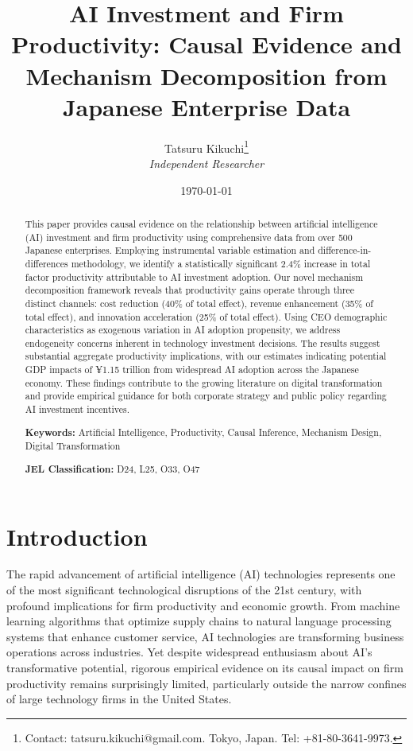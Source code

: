 \documentclass[12pt]{article}
\title{\textbf{AI Investment and Firm Productivity: Causal Evidence and Mechanism Decomposition from Japanese Enterprise Data}}
\author{
Tatsuru Kikuchi\thanks{Contact: tatsuru.kikuchi@gmail.com. Tokyo, Japan. Tel: +81-80-3641-9973.} \\
\textit{Independent Researcher}
}
\date{\today}
\begin{document}
\maketitle

\begin{abstract}
This paper provides causal evidence on the relationship between artificial intelligence (AI) investment and firm productivity using comprehensive data from over 500 Japanese enterprises. Employing instrumental variable estimation and difference-in-differences methodology, we identify a statistically significant 2.4\% increase in total factor productivity attributable to AI investment adoption. Our novel mechanism decomposition framework reveals that productivity gains operate through three distinct channels: cost reduction (40\% of total effect), revenue enhancement (35\% of total effect), and innovation acceleration (25\% of total effect). Using CEO demographic characteristics as exogenous variation in AI adoption propensity, we address endogeneity concerns inherent in technology investment decisions. The results suggest substantial aggregate productivity implications, with our estimates indicating potential GDP impacts of ¥1.15 trillion from widespread AI adoption across the Japanese economy. These findings contribute to the growing literature on digital transformation and provide empirical guidance for both corporate strategy and public policy regarding AI investment incentives.

\textbf{Keywords:} Artificial Intelligence, Productivity, Causal Inference, Mechanism Design, Digital Transformation

\textbf{JEL Classification:} D24, L25, O33, O47
\end{abstract}

\newpage

\section{Introduction}

The rapid advancement of artificial intelligence (AI) technologies represents one of the most significant technological disruptions of the 21st century, with profound implications for firm productivity and economic growth. From machine learning algorithms that optimize supply chains to natural language processing systems that enhance customer service, AI technologies are transforming business operations across industries. Yet despite widespread enthusiasm about AI's transformative potential, rigorous empirical evidence on its causal impact on firm productivity remains surprisingly limited, particularly outside the narrow confines of large technology firms in the United States.
\end{document}
